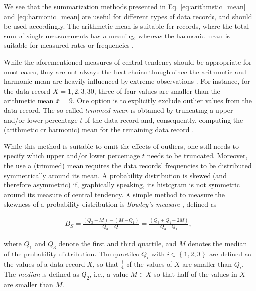 We see that the summarization methods presented in Eq. \ref{eq:arithmetic_mean}
and \ref{eq:harmonic_mean} are useful for different types of data records, and
should be used accordingly. The arithmetic mean is suitable for records, where the total sum of single
measurements has a meaning, whereas the harmonic mean is suitable for measured
rates or frequencies \citep{smith_characterizing_1988}.

While the aforementioned measures of central tendency should be appropriate for
most cases, they are not always the best choice though since the arithmetic
and harmonic mean are heavily influenced by extreme observations
\citep{shanmugam_statistics_2015}. 
For instance, for the data record $X = 1, 2, 3, 30$, three of four values are
smaller than the arithmetic mean $\bar{x} = 9$. One option is to explicitly exclude outlier
values from the data record. The so-called \emph{trimmed mean} is
obtained by truncating a upper and/or lower percentage $t$ of the data record
and, consequently, computing the (arithmetic or harmonic) mean for the remaining
data record \citep{shanmugam_statistics_2015}. 

While this method is suitable to omit the effects of outliers, one still needs to specify
which upper and/or lower percentage $t$ needs to be truncated. Moreover, the use
a (trimmed) mean requires the data records' frequencies to be distributed
symmetrically around its mean.
A probability distribution is skewed (and therefore asymmetric) if, graphically speaking, its histogram is not
symmetric around its measure of central tendency. A simple method to measure the
skewness of a probability distribution is \emph{Bowley's measure}
\citep{shanmugam_statistics_2015}, defined as

\begin{equation} \label{eq:bowley}
\begin{split}
B_S = \frac{(Q_3 - M) - (M - Q_1)}{Q_3 - Q_1} = \frac{(Q_3 + Q_1 - 2M)}{Q_3
- Q_1},
\end{split}
\end{equation}

where $Q_1$ and $Q_3$ denote the first and third quartile, and $M$ denotes the
median of the probability distribution. The quartiles $Q_i$ with $i \in \left\{
1,2,3 \right\}$ are defined as the values of a data record $X$, so that
$\frac{i}{4}$ of the values of $X$ are smaller than $Q_i$. The \emph{median} is
defined as $Q_2$, i.e., a value $M \in X$ so that half of the values in $X$ are smaller than $M$.

